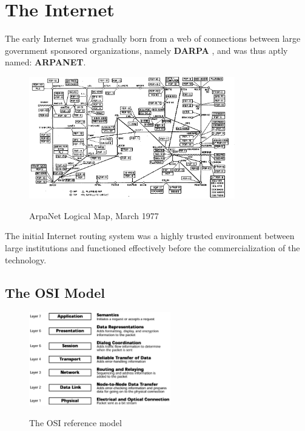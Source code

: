 \documentclass[11pt]{article}
\begin{document}
\section{The Internet}

The early Internet was gradually born from a web of connections between large government sponsored organizations, namely 
\textbf{DARPA} \cite{Internet-History}, 
and was thus aptly named: \textbf{ARPANET}. 

\begin{figure}[h]
    \centering
    \includegraphics[width=0.80\textwidth]{./images/rsz_arpanet.png} \\
    \caption{ArpaNet Logical Map, March 1977 \cite{ARPANET}}
\end{figure}

\noindent The initial Internet routing system was a highly trusted environment between large institutions and functioned effectively before the commercialization of the technology.


\subsection{The OSI Model}

\begin{figure}
    \centering
    \vspace{-30pt}
    \hspace{0pt}
    \includegraphics[width=0.55\textwidth]{./images/rsz_osi.png} \\
    \caption{The OSI reference model \cite{NetworkOSI}}
\end{figure}
\end{document}
